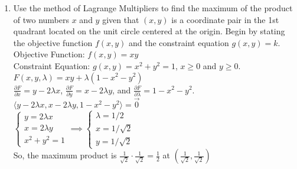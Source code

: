 \begin{enumerate}
	\item Use the method of Lagrange Multipliers to find the maximum of the product of two numbers $x$ and $y$ given that $(x,y)$ is a coordinate pair in the 1st quadrant located on the unit circle centered at the origin. Begin by stating the objective function $f(x,y)$ and the constraint equation $g(x,y)=k$.\\
	\indent
	Objective Function: $f(x,y)=xy$\\
	Constraint Equation: $g(x,y)=x^2+y^2=1$, $x\geq 0$ and $y\geq 0$.\\
	$F(x,y,\lambda)=xy+\lambda(1-x^2-y^2)$\\
	$\frac{\partial F}{\partial x}=y-2\lambda x$, $\frac{\partial F}{\partial y}=x-2\lambda y$, and $\frac{\partial F}{\partial\lambda}=1-x^2-y^2$.\\
	$\langle y-2\lambda x,x-2\lambda y,1-x^2-y^2\rangle=\vec{0}$\\
	$\begin{cases}
		y=2\lambda x \\
		x=2\lambda y \\
		x^2+y^2=1
	\end{cases} 
	\implies
	\begin{cases}
		\lambda = 1/2 \\
		x = 1/\sqrt{2} \\
		y = 1/\sqrt{2}
	\end{cases}$\\
	So, the maximum product is $\frac{1}{\sqrt{2}}\cdot\frac{1}{\sqrt{2}}=\frac{1}{2}$ at $\left(\frac{1}{\sqrt{2}},\frac{1}{\sqrt{2}}\right)$\\
	

\end{enumerate}
